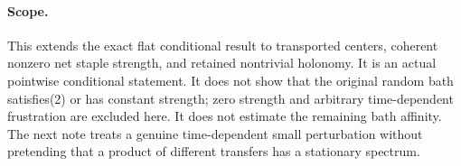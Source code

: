 \documentclass[11pt]{article}
\begin{document}
\paragraph{Scope.}
This extends the exact flat conditional result to transported centers, coherent
nonzero net staple strength, and retained nontrivial holonomy. It is an actual
pointwise conditional statement. It does not show that the original random bath
satisfies(2) or has constant strength; zero strength and arbitrary time-dependent
frustration are excluded here. It does not estimate the remaining bath affinity.
The next note treats a genuine time-dependent small perturbation without
pretending that a product of different transfers has a stationary spectrum.
\end{document}
